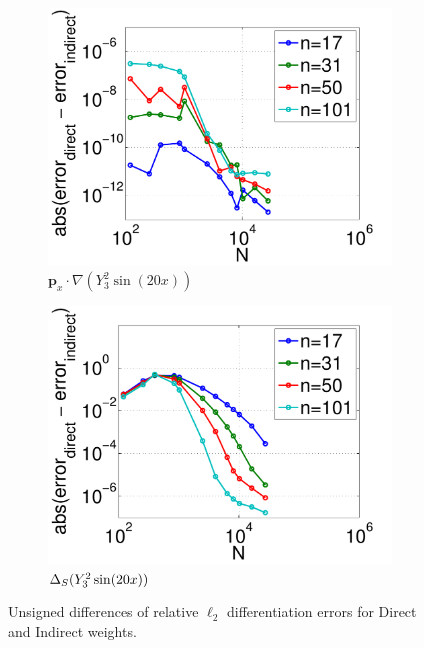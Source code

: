 \begin{figure}
	\centering
		\begin{subfigure}[t]{0.48\textwidth}
		\centering
	\includegraphics[width=1.0\textwidth]{../figures/appendices/direct_vs_indirect_weights/compare_weight_generation/xsfc_vs_xsfc_alt_on_sph32_times_sine_20x/abs_diff_of_rel_l2_errors-eps-converted-to.pdf}
	\caption{$\mathbf{p}_{x} \cdot \nabla ( Y_{3}^{2} \sin(20 x))$}
	\end{subfigure}
	\begin{subfigure}[t]{0.48\textwidth}
	\centering
	\includegraphics[width=1.0\textwidth]{../figures/appendices/direct_vs_indirect_weights/compare_weight_generation/lsfc_vs_px_grad_dot_px_grad/abs_diff_of_rel_l2_errors-eps-converted-to.pdf}
	\caption{$\Delta_S ( Y_{3}^{2} \sin(20 x) )$}
	\end{subfigure}
		\caption{Unsigned differences of relative $\ell_{2}$ differentiation errors for Direct and Indirect weights.}
		\label{fig:direct_vs_indirect_unsigned_diff}
\end{figure}



%
%
%
